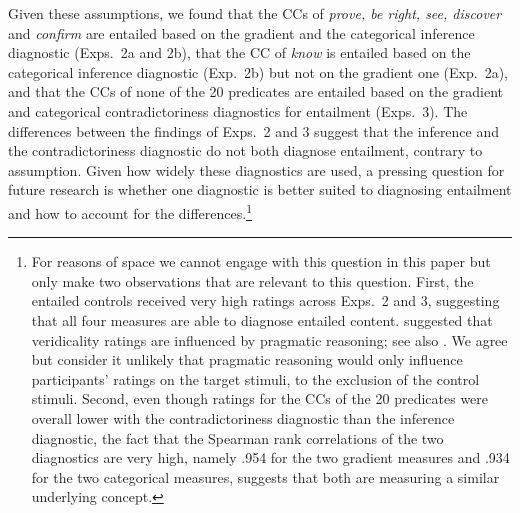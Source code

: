 \documentclass[11pt,fleqn]{article}
\newcommand{\6}{\mbox{$[\hspace*{-.6mm}[$}}
\newcommand{\9}{\mbox{$]\hspace*{-.6mm}]$}}
\begin{document}
{Given these assumptions, we found that the CCs of {\em prove, be right, see, discover} and {\em confirm} are entailed based on the gradient and the categorical inference diagnostic (Exps.~2a and 2b), that the CC of {\em know} is entailed based on the categorical inference diagnostic (Exp.~2b) but not on the gradient one (Exp.~2a), and that the CCs of none of the 20 predicates are entailed based on the gradient and categorical contradictoriness diagnostics for entailment (Exps.~3). The differences between the findings of Exps.~2 and 3 suggest that the inference and the contradictoriness diagnostic do not both diagnose entailment, contrary to assumption. Given how widely these diagnostics are used, a pressing question for future research is whether one diagnostic is better suited to diagnosing entailment and how to account for the differences.\footnote{For reasons of space we cannot engage with this question in this paper but only make two observations that are relevant to this question. First, the entailed controls received very high ratings across Exps.~2 and 3, suggesting that all four measures are able to diagnose entailed content. \citet[329]{demarneffe-etal2012} suggested that veridicality ratings are influenced by pragmatic reasoning; see also \citealt{pavlick-kwiatkowski2019}. We agree but consider it unlikely that pragmatic reasoning would only influence participants' ratings on the target stimuli, to the exclusion of the control stimuli. Second, even though ratings for the CCs of the 20 predicates were overall lower with the  contradictoriness diagnostic than the inference diagnostic, the fact that the Spearman rank correlations of the two diagnostics are very high, namely .954 for the two gradient measures and .934 for the two categorical measures, suggests that both are measuring a similar underlying concept.}


}
\end{document}
